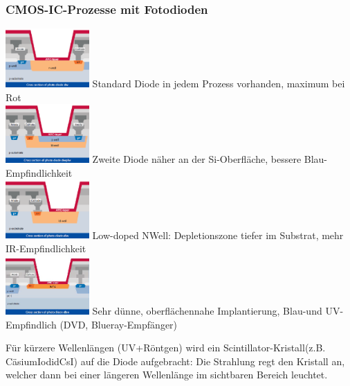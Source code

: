 \subsubsection{CMOS-IC-Prozesse mit Fotodioden}
\begin{multicols}{4}
    \includegraphics[width=0.24\textwidth]{images/eindringtiefe_01}
    Standard Diode in jedem Prozess vorhanden, maximum bei Rot \\
    \includegraphics[width=0.24\textwidth]{images/eindringtiefe_02}
    Zweite Diode näher an der Si-Oberfläche, bessere Blau-Empfindlichkeit \\
    \includegraphics[width=0.24\textwidth]{images/eindringtiefe_03}
    Low-doped NWell: Depletionszone tiefer im Substrat, mehr IR-Empfindlichkeit \\
    \includegraphics[width=0.24\textwidth]{images/eindringtiefe_04}
    Sehr dünne, oberflächennahe Implantierung, Blau-und UV-Empfindlich (DVD, Blueray-Empfänger)
\end{multicols}

Für kürzere Wellenlängen (UV+Röntgen) wird ein Scintillator-Kristall(z.B. CäsiumIodidCsI) auf die Diode aufgebracht: Die Strahlung regt den Kristall an, welcher dann bei einer längeren Wellenlänge im sichtbaren Bereich leuchtet.

